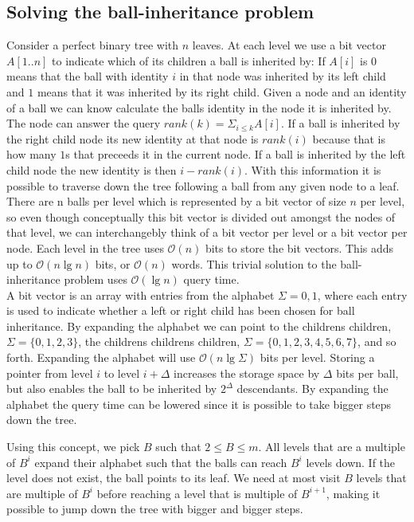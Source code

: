 \subsection{Solving the ball-inheritance problem} 
\label{ssection:solving-ball}

Consider a perfect binary tree with $n$ leaves. At each level we use a bit vector $A[1..n]$ to indicate which of its children a ball is inherited by: If $A[i]$ is $0$ means that the ball with identity $i$ in that node was inherited by its left child and $1$ means that it was inherited by its right child. Given a node and an identity of a ball we can know calculate the balls identity in the node it is inherited by. The node can answer the query $rank(k) = \Sigma_{i \leq k} A[i]$. If a ball is inherited by the right child node its new identity at that node is $rank(i)$ because that is how many $1$s that preceeds it in the current node. If a ball is inherited by the left child node the new identity is then $i-rank(i)$. With this information it is possible to traverse down the tree following a ball from any given node to a leaf. There are n balls per level which is represented by a bit vector of size $n$ per level, so even though conceptually this bit vector is divided out amongst the nodes of that level, we can interchangebly think of a bit vector per level or a bit vector per node. Each level in the tree uses $\mathcal{O}(n)$ bits to store the bit vectors. This adds up to $\mathcal{O}(n \lg n)$ bits, or $\mathcal{O}(n)$ words. This trivial solution to the ball-inheritance problem uses $\mathcal{O}(\lg n)$ query time. \\


A bit vector is an array with entries from the alphabet $\Sigma = {0,1}$, where each entry is used to indicate whether a left or right child has been chosen for ball inheritance. By expanding the alphabet we can point to the childrens children, $\Sigma = \{0,1,2,3\}$, the childrens childrens children, $\Sigma = \{0,1,2,3,4,5,6,7\}$, and so forth. Expanding the alphabet will use $\mathcal{O}(n \lg \Sigma)$ bits per level. Storing a pointer from level $i$ to level $i+\Delta$ increases the storage space by $\Delta$ bits per ball, but also enables the ball to be inherited by $2^\Delta$ descendants. By expanding the alphabet the query time can be lowered since it is possible to take bigger steps down the tree. 

Using this concept, we pick $B$ such that $2 \leq B \leq m$. All levels that are a multiple of $B^i$ expand their alphabet such that the balls can reach $B^i$ levels down. If the level does not exist, the ball points to its leaf. We need at most visit $B$ levels that are multiple of $B^i$ before reaching a level that is multiple of $B^{i+1}$, making it possible to jump down the tree with bigger and bigger steps.

